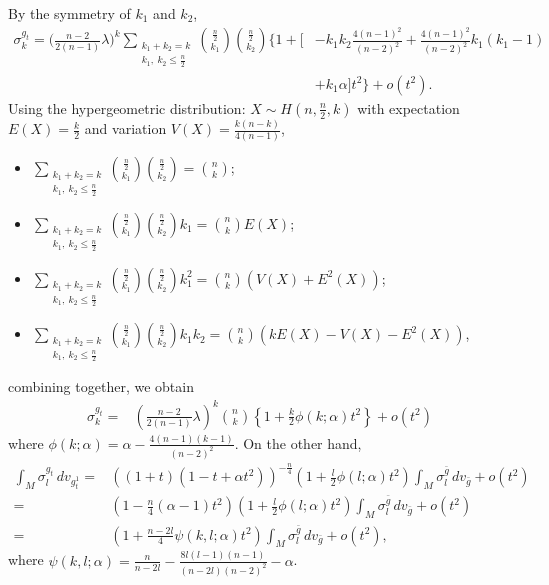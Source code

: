 \documentclass[12pt]{amsart}
\newcommand{\bg}{\bar{g}}
\numberwithin{equation}{section}
\begin{document}
By the symmetry of $k_1$ and $k_2$, 
\begin{align*}
    \sigma_k^{g_t}=\Bigg(\frac{n-2}{2(n-1)}\lambda\Bigg)^{k}\sum_{\substack{k_1+k_2=k \\ k_1,\ k_2\leq\frac{n}{2}}}\binom{\frac{n}{2}}{k_1}\binom{\frac{n}{2}}{k_2}\Bigg\{1+\Bigg[&-k_1k_2\frac{4(n-1)^2}{(n-2)^2}+\frac{4(n-1)^2}{(n-2)^2}k_1(k_1-1)\\
    &+k_1\alpha\Bigg]t^2\Bigg\}+o(t^2).
\end{align*}
Using the hypergeometric distribution: $X\sim H(n,\frac{n}{2},k)$ with expectation $E(X)=\frac{k}{2}$ and variation $V(X)=\frac{k(n-k)}{4(n-1)}$, 
\begin{itemize}
    \item $\sum_{\substack{k_1+k_2=k \\ k_1,\ k_2\leq\frac{n}{2}}}\binom{\frac{n}{2}}{k_1}\binom{\frac{n}{2}}{k_2}=\binom{n}{k}$;
    \item $\sum_{\substack{k_1+k_2=k \\ k_1,\ k_2\leq\frac{n}{2}}}\binom{\frac{n}{2}}{k_1}\binom{\frac{n}{2}}{k_2}k_1=\binom{n}{k}E(X)$;
    \item $\sum_{\substack{k_1+k_2=k \\ k_1,\ k_2\leq\frac{n}{2}}}\binom{\frac{n}{2}}{k_1}\binom{\frac{n}{2}}{k_2}k_1^2=\binom{n}{k}\left(V(X)+E^2(X)\right)$;
    \item $\sum_{\substack{k_1+k_2=k \\ k_1,\ k_2\leq\frac{n}{2}}}\binom{\frac{n}{2}}{k_1}\binom{\frac{n}{2}}{k_2}k_1k_2=\binom{n}{k}\left(kE(X)-V(X)-E^2(X)\right)$,
\end{itemize}
combining together, we obtain
\begin{align*}
\sigma_k^{g_t} = &\left( \frac{n-2}{2(n-1)} \lambda \right)^k \binom{n}{k} \left\{ 1 + \frac{k}{2}\phi(k;\alpha)t^2 \right\}+ o(t^2)
\end{align*}
where $\phi(k;\alpha)=\alpha-\frac{4(n-1)(k-1)}{(n-2)^2}$. On the other hand, 
\begin{align*}
\int_M \sigma_l^{g_t}\, dv_{g_t^1} =&\left((1+t)\left(1-t+\alpha t^2\right)\right)^{-\frac{n}{4}}\left(1+\frac{l}{2}\phi(l;\alpha)t^2\right)\int_M \sigma_l^{\bg}\, dv_{\bg}+ o(t^2)\\
=&\left(1-\frac{n}{4}(\alpha-1)t^2\right)\left(1+\frac{l}{2}\phi(l;\alpha)t^2\right)\int_M \sigma_l^{\bg}\, dv_{\bg}+ o(t^2)\\
=&\left( 1 + \frac{n-2l}{4}\psi(k,l;\alpha) t^2 \right)\int_M \sigma_l^{\bg}\, dv_{\bg}+ o(t^2),
\end{align*}
where $\psi(k,l;\alpha)=\frac{n}{n-2l}-\frac{8l(l-1)(n-1)}{(n-2l)(n-2)^2}-\alpha$. 
\end{document}

